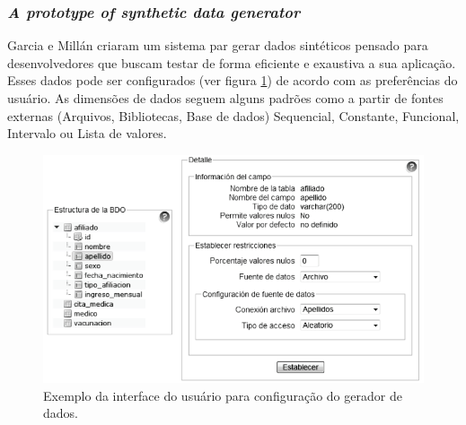 \documentclass[
	12pt,				%
	openright,			%
	twoside,			%
	a4paper,			%
	english,			%
	brazil				%
	]{abntex2}
\begin{document}
	\subsubsection{\emph{A prototype of synthetic data generator}}
	Garcia e Millán \cite{Garcia2011} criaram um sistema par gerar dados sintéticos pensado para desenvolvedores que buscam testar de forma eficiente e exaustiva a sua aplicação. Esses dados pode ser configurados (ver figura \ref{fig:garcia}) de acordo com as preferências do usuário. As dimensões de dados seguem alguns padrões como a partir de fontes externas (Arquivos, Bibliotecas, Base de dados) Sequencial, Constante, Funcional, Intervalo ou Lista de valores. 
	\begin{figure}[h!]
		\centering
		\includegraphics[width=\linewidth]{./figures/TrabalhosRelacionados/Garcia18.png}
		\caption{Exemplo da interface do usuário para configuração do gerador de dados.}
		\label{fig:garcia}
	\end{figure}
\end{document}
